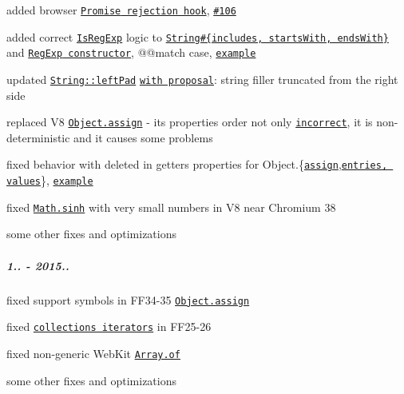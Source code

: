 \begin{DoxyItemize}
\item added browser \href{#unhandled-rejection-tracking}{\tt {\ttfamily Promise} rejection hook}, \href{https://github.com/zloirock/core-js/issues/106}{\tt \#106}
\item added correct \href{http://www.ecma-international.org/ecma-262/6.0/#sec-isregexp}{\tt {\ttfamily Is\+Reg\+Exp}} logic to \href{https://github.com/zloirock/core-js/#ecmascript-6-string}{\tt {\ttfamily String\#\{includes, starts\+With, ends\+With\}}} and \href{https://github.com/zloirock/core-js/#ecmascript-6-regexp}{\tt {\ttfamily Reg\+Exp} constructor}, {\ttfamily @@match} case, \href{https://developer.mozilla.org/en-US/docs/Web/JavaScript/Reference/Global_Objects/Symbol/match#Disabling_the_isRegExp_check}{\tt example}
\item updated \href{https://github.com/zloirock/core-js/#ecmascript-7}{\tt {\ttfamily String\+::left\+Pad}} \href{https://github.com/ljharb/proposal-string-pad-left-right/issues/6}{\tt with proposal}\+: string filler truncated from the right side
\item replaced V8 \href{https://github.com/zloirock/core-js/#ecmascript-6-object}{\tt {\ttfamily Object.\+assign}} -\/ its properties order not only \href{https://github.com/sindresorhus/object-assign/issues/22}{\tt incorrect}, it is non-\/deterministic and it causes some problems
\item fixed behavior with deleted in getters properties for {\ttfamily Object.\{}\href{https://github.com/zloirock/core-js/#ecmascript-6-object}{\tt {\ttfamily assign}}{\ttfamily ,}\href{https://github.com/zloirock/core-js/#ecmascript-7}{\tt {\ttfamily entries, values}}{\ttfamily \}}, \href{http://goo.gl/iQE01c}{\tt example}
\item fixed \href{https://github.com/zloirock/core-js/#ecmascript-6-math}{\tt {\ttfamily Math.\+sinh}} with very small numbers in V8 near Chromium 38
\item some other fixes and optimizations
\end{DoxyItemize}

\subparagraph*{1.. -\/ 2015..}


\begin{DoxyItemize}
\item fixed support symbols in F\+F34-\/35 \href{https://github.com/zloirock/core-js/#ecmascript-6-object}{\tt {\ttfamily Object.\+assign}}
\item fixed \href{https://github.com/zloirock/core-js/#ecmascript-6-iterators}{\tt collections iterators} in F\+F25-\/26
\item fixed non-\/generic Web\+Kit \href{https://github.com/zloirock/core-js/#ecmascript-6-array}{\tt {\ttfamily Array.\+of}}
\item some other fixes and optimizations
\end{DoxyItemize}

